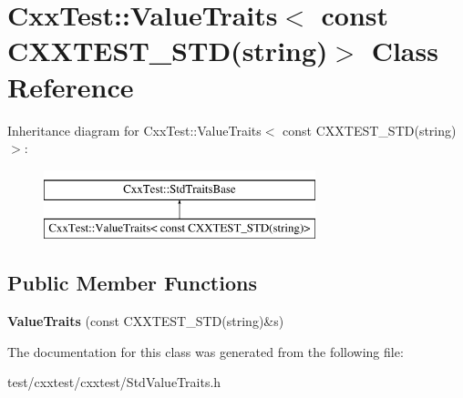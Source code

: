 \hypertarget{classCxxTest_1_1ValueTraits_3_01const_01CXXTEST__STD_07string_08_4}{\section{Cxx\-Test\-:\-:Value\-Traits$<$ const C\-X\-X\-T\-E\-S\-T\-\_\-\-S\-T\-D(string)$>$ Class Reference}
\label{classCxxTest_1_1ValueTraits_3_01const_01CXXTEST__STD_07string_08_4}
}
Inheritance diagram for Cxx\-Test\-:\-:Value\-Traits$<$ const C\-X\-X\-T\-E\-S\-T\-\_\-\-S\-T\-D(string)$>$\-:\begin{figure}[H]
\begin{center}
\leavevmode
\includegraphics[height=2.000000cm]{classCxxTest_1_1ValueTraits_3_01const_01CXXTEST__STD_07string_08_4}
\end{center}
\end{figure}
\subsection*{Public Member Functions}
\begin{DoxyCompactItemize}
\item 
\hypertarget{classCxxTest_1_1ValueTraits_3_01const_01CXXTEST__STD_07string_08_4_ad5c91e1d9778dd564924c68bbddd3f62}{{\bfseries Value\-Traits} (const C\-X\-X\-T\-E\-S\-T\-\_\-\-S\-T\-D(string)\&s)}\label{classCxxTest_1_1ValueTraits_3_01const_01CXXTEST__STD_07string_08_4_ad5c91e1d9778dd564924c68bbddd3f62}

\end{DoxyCompactItemize}


The documentation for this class was generated from the following file\-:\begin{DoxyCompactItemize}
\item 
test/cxxtest/cxxtest/Std\-Value\-Traits.\-h\end{DoxyCompactItemize}
